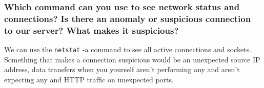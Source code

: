 \subsubsection{Which command can you use to see network status and connections? Is there an anomaly or suspicious connection to our server? What makes it suspicious?}
We can use the \texttt{netstat} -a command to see all active connections and sockets. Something that makes a connection suspicious would be an unexpected source IP address, data transfers when you yourself aren't performing any and aren't expecting any and HTTP traffic on unexpected ports.